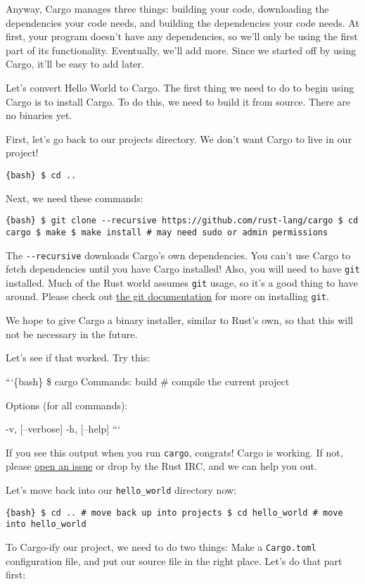 \documentclass[]{article}
\begin{document}
Anyway, Cargo manages three things: building your code, downloading the
dependencies your code needs, and building the dependencies your code
needs. At first, your program doesn't have any dependencies, so we'll
only be using the first part of its functionality. Eventually, we'll add
more. Since we started off by using Cargo, it'll be easy to add later.

Let's convert Hello World to Cargo. The first thing we need to do to
begin using Cargo is to install Cargo. To do this, we need to build it
from source. There are no binaries yet.

First, let's go back to our projects directory. We don't want Cargo to
live in our project!

\texttt{\{bash\} \$ cd ..}

Next, we need these commands:

\texttt{\{bash\} \$ git clone -\/-recursive https://github.com/rust-lang/cargo \$ cd cargo \$ make \$ make install \# may need sudo or admin permissions}

The \texttt{-\/-recursive} downloads Cargo's own dependencies. You can't
use Cargo to fetch dependencies until you have Cargo installed! Also,
you will need to have \texttt{git} installed. Much of the Rust world
assumes \texttt{git} usage, so it's a good thing to have around. Please
check out
\href{http://git-scm.com/book/en/Getting-Started-Installing-Git}{the git
documentation} for more on installing \texttt{git}.

We hope to give Cargo a binary installer, similar to Rust's own, so that
this will not be necessary in the future.

Let's see if that worked. Try this:

```\{bash\} \$ cargo Commands: build \# compile the current project

Options (for all commands):

-v, {[}--verbose{]} -h, {[}--help{]} ```

If you see this output when you run \texttt{cargo}, congrats! Cargo is
working. If not, please
\href{https://github.com/rust-lang/cargo/issues/new}{open an issue} or
drop by the Rust IRC, and we can help you out.

Let's move back into our \texttt{hello\_world} directory now:

\texttt{\{bash\} \$ cd ..              \# move back up into projects \$ cd hello\_world     \# move into hello\_world}

To Cargo-ify our project, we need to do two things: Make a
\texttt{Cargo.toml} configuration file, and put our source file in the
right place. Let's do that part first:
\end{document}
